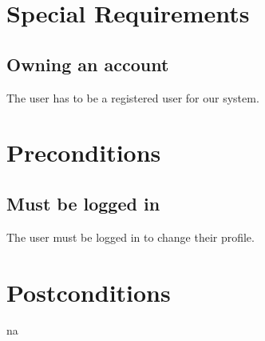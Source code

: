 \documentclass[a4paper,12pt,chapterprefix=false,bibliography=totoc,listof=totoc,book]{scrreprt}
\begin{document}
    \chapter{Special Requirements}
    \section{Owning an account}
    The user has to be a registered user for our system.

    \chapter{Preconditions}
    \section{Must be logged in}
    The user must be logged in to change their profile.

    \chapter{Postconditions}
    \gls{na}
\end{document}
